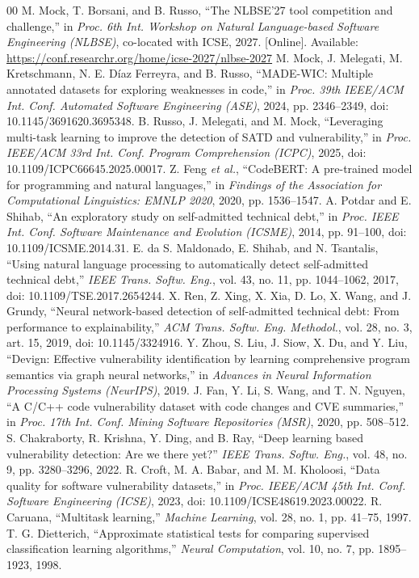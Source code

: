 \documentclass[conference]{IEEEtran}
\begin{document}
\begin{thebibliography}{00}
 M. Mock, T. Borsani, and B. Russo, ``The NLBSE'27 tool competition and challenge,'' in \emph{Proc. 6th Int. Workshop on Natural Language-based Software Engineering (NLBSE)}, co-located with ICSE, 2027. [Online]. Available: \url{https://conf.researchr.org/home/icse-2027/nlbse-2027}
 M. Mock, J. Melegati, M. Kretschmann, N. E. D\'iaz Ferreyra, and B. Russo, ``MADE-WIC: Multiple annotated datasets for exploring weaknesses in code,'' in \emph{Proc. 39th IEEE/ACM Int. Conf. Automated Software Engineering (ASE)}, 2024, pp. 2346--2349, doi: 10.1145/3691620.3695348.
 B. Russo, J. Melegati, and M. Mock, ``Leveraging multi-task learning to improve the detection of SATD and vulnerability,'' in \emph{Proc. IEEE/ACM 33rd Int. Conf. Program Comprehension (ICPC)}, 2025, doi: 10.1109/ICPC66645.2025.00017.
 Z. Feng \emph{et al.}, ``CodeBERT: A pre-trained model for programming and natural languages,'' in \emph{Findings of the Association for Computational Linguistics: EMNLP 2020}, 2020, pp. 1536--1547.
 A. Potdar and E. Shihab, ``An exploratory study on self-admitted technical debt,'' in \emph{Proc. IEEE Int. Conf. Software Maintenance and Evolution (ICSME)}, 2014, pp. 91--100, doi: 10.1109/ICSME.2014.31.
 E. da S. Maldonado, E. Shihab, and N. Tsantalis, ``Using natural language processing to automatically detect self-admitted technical debt,'' \emph{IEEE Trans. Softw. Eng.}, vol. 43, no. 11, pp. 1044--1062, 2017, doi: 10.1109/TSE.2017.2654244.
 X. Ren, Z. Xing, X. Xia, D. Lo, X. Wang, and J. Grundy, ``Neural network-based detection of self-admitted technical debt: From performance to explainability,'' \emph{ACM Trans. Softw. Eng. Methodol.}, vol. 28, no. 3, art. 15, 2019, doi: 10.1145/3324916.
 Y. Zhou, S. Liu, J. Siow, X. Du, and Y. Liu, ``Devign: Effective vulnerability identification by learning comprehensive program semantics via graph neural networks,'' in \emph{Advances in Neural Information Processing Systems (NeurIPS)}, 2019.
 J. Fan, Y. Li, S. Wang, and T. N. Nguyen, ``A C/C++ code vulnerability dataset with code changes and CVE summaries,'' in \emph{Proc. 17th Int. Conf. Mining Software Repositories (MSR)}, 2020, pp. 508--512.
 S. Chakraborty, R. Krishna, Y. Ding, and B. Ray, ``Deep learning based vulnerability detection: Are we there yet?'' \emph{IEEE Trans. Softw. Eng.}, vol. 48, no. 9, pp. 3280--3296, 2022.
 R. Croft, M. A. Babar, and M. M. Kholoosi, ``Data quality for software vulnerability datasets,'' in \emph{Proc. IEEE/ACM 45th Int. Conf. Software Engineering (ICSE)}, 2023, doi: 10.1109/ICSE48619.2023.00022.
 R. Caruana, ``Multitask learning,'' \emph{Machine Learning}, vol. 28, no. 1, pp. 41--75, 1997.
 T. G. Dietterich, ``Approximate statistical tests for comparing supervised classification learning algorithms,'' \emph{Neural Computation}, vol. 10, no. 7, pp. 1895--1923, 1998.
\end{thebibliography}
\end{document}
